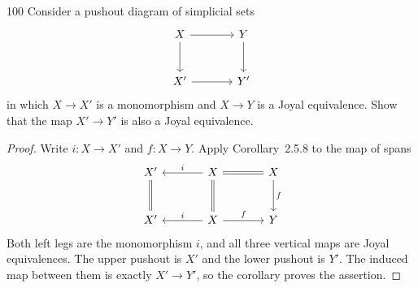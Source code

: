 \begin{exercise}{100}
Consider a pushout diagram of simplicial sets
\[
\begin{tikzcd}[column sep=large,row sep=large]
 X \arrow[r] \arrow[d] & Y \arrow[d] \\
 X' \arrow[r] & Y'
\end{tikzcd}
\]
in which $X\to X'$ is a monomorphism and $X\to Y$ is a Joyal equivalence.
Show that the map $X'\to Y'$ is also a Joyal equivalence.

\begin{proof}
Write $i\colon X\to X'$ and $f\colon X\to Y$.
Apply Corollary~2.5.8 to the map of spans
\[
\begin{tikzcd}[column sep=large,row sep=large]
 X' \arrow[d,equal] & X \arrow[l,"i"'] \arrow[r,equal] \arrow[d,equal]
   & X \arrow[d,"f"] \\
 X' & X \arrow[l,"i"'] \arrow[r,"f"] & Y
\end{tikzcd}
\]
Both left legs are the monomorphism $i$, and all three vertical maps are
Joyal equivalences.
The upper pushout is $X'$ and the lower pushout is $Y'$.
The induced map between them is exactly $X'\to Y'$, so the corollary
proves the assertion.
\end{proof}
\end{exercise}
